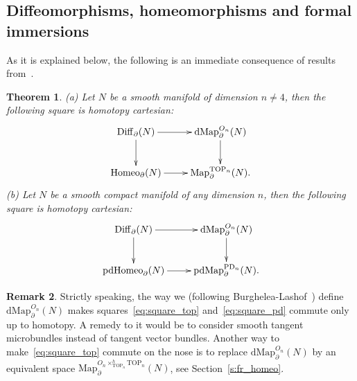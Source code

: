 \documentclass[11pt]{amsart}
\newtheorem{theorem}{Theorem}[section]
\theoremstyle{definition}
\newtheorem{remark}[theorem]{Remark}
\newcommand{\Map}{\mathrm{Map}}
\newcommand{\dMap}{\mathrm{dMap}}
\newcommand{\pdMap}{\mathrm{pdMap}}
\newcommand{\Diff}{\mathrm{Diff}}
\newcommand{\Homeo}{\mathrm{Homeo}}
\newcommand{\pdHomeo}{\mathrm{pdHomeo}}
\newcommand{\TOP}{\mathrm{TOP}}
\newcommand{\PD}{\mathrm{PD}}
\numberwithin{equation}{section}
\begin{document}
\subsection{Diffeomorphisms, homeomorphisms and formal immersions}\label{ss:square1}
As it is explained below, the following is an immediate consequence of results from~\cite{KS_essays,BL_diff}.

\begin{theorem}\label{th:square_diff}
(a) Let $N$ be a smooth manifold of dimension $n\neq 4$, then the following square is homotopy cartesian:
\begin{equation}\label{eq:square_top}
\xymatrix{
\Diff_\partial(N)\ar[d]\ar[r]&\dMap_\partial^{O_n}(N)\ar[d]\\
\Homeo_\partial(N)\ar[r]&\Map_\partial^{\TOP_n}(N).
}
\end{equation}
(b) Let $N$ be a smooth compact manifold of any dimension $n$, then the following square is homotopy cartesian:
\begin{equation}\label{eq:square_pd}
\xymatrix{
\Diff_\partial(N)\ar[d]\ar[r]&\dMap_\partial^{O_n}(N)\ar[d]\\
\pdHomeo_\partial(N)\ar[r]&\pdMap_\partial^{\PD_n}(N).
}
\end{equation}

\end{theorem}

\begin{remark}\label{r:sq_non-comm}
Strictly speaking, the way we (following Burghelea-Lashof~\cite{BL_diff}) define $\dMap_\partial^{O_n}(N)$ makes squares~\eqref{eq:square_top} and~\eqref{eq:square_pd}
commute only up to homotopy. A remedy to it would be to consider smooth tangent microbundles instead of tangent vector bundles. Another way to make~\eqref{eq:square_top}
commute on the nose is to replace  $\dMap_\partial^{O_n}(N)$ by an equivalent space $\Map_\partial^{O_n\times^h_{\TOP_n}\TOP_n}(N)$, see Section~\ref{s:fr_homeo}.
\end{remark}
\end{document}
